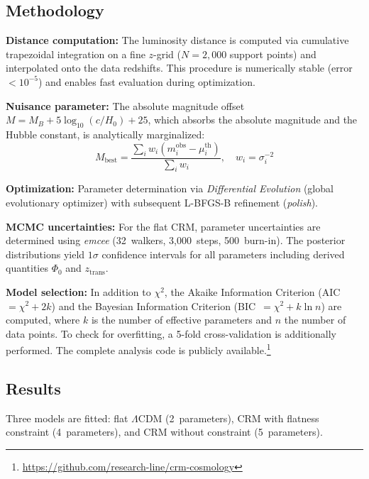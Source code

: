 \documentclass[aps,prd,twocolumn,superscriptaddress,nofootinbib]{revtex4-2}
\begin{document}
\subsection{Methodology}
\label{subsec:methodology}

\textbf{Distance computation:} The luminosity distance is computed via cumulative trapezoidal integration on a fine $z$-grid ($N = 2{,}000$ support points) and interpolated onto the data redshifts. This procedure is numerically stable (error $< 10^{-5}$) and enables fast evaluation during optimization.

\textbf{Nuisance parameter:} The absolute magnitude offset $M = M_B + 5\log_{10}(c/H_0) + 25$, which absorbs the absolute magnitude and the Hubble constant, is analytically marginalized:
\begin{equation}
M_{\mathrm{best}} = \frac{\sum_i w_i (m_i^{\mathrm{obs}} - \mu_i^{\mathrm{th}})}{\sum_i w_i}, \quad w_i = \sigma_i^{-2}
\end{equation}

\textbf{Optimization:} Parameter determination via \textit{Differential Evolution} (global evolutionary optimizer) with subsequent L-BFGS-B refinement (\textit{polish}).

\textbf{MCMC uncertainties:} For the flat CRM, parameter uncertainties are determined using \textit{emcee} \cite{ForemanMackey2013} (32~walkers, 3,000~steps, 500~burn-in). The posterior distributions yield $1\sigma$ confidence intervals for all parameters including derived quantities $\Phi_0$ and $z_{\mathrm{trans}}$.

\textbf{Model selection:} In addition to $\chi^2$, the Akaike Information Criterion (AIC~$= \chi^2 + 2k$) and the Bayesian Information Criterion (BIC~$= \chi^2 + k \ln n$) are computed, where $k$ is the number of effective parameters and $n$ the number of data points. To check for overfitting, a 5-fold cross-validation is additionally performed. The complete analysis code is publicly available.\footnote{\url{https://github.com/research-line/crm-cosmology}}

\subsection{Results}
\label{subsec:results}

Three models are fitted: flat $\Lambda$CDM (2~parameters), CRM with flatness constraint (4~parameters), and CRM without constraint (5~parameters).
\end{document}
